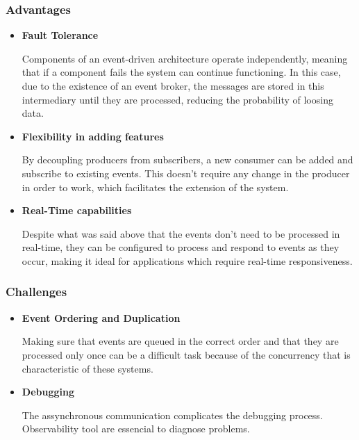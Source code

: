 \subsubsection{Advantages}
\begin{itemize}

	\item \textbf{Fault Tolerance}

	      Components of an event-driven architecture operate independently, meaning
	      that if a component fails the system can continue functioning. In this
	      case, due to the existence of an event broker, the messages are stored in
	      this intermediary until they are processed, reducing the probability of
	      loosing data\cite{AWSEventDriven}.

	\item \textbf{Flexibility in adding features}

	      By decoupling producers from subscribers, a new consumer can be added
	      and subscribe to existing events. This doesn't require any change in the
	      producer in order to work, which facilitates the extension of the
	      system\cite{MicrosoftEventDriven}.

	\item \textbf{Real-Time capabilities}

	      Despite what was said above that the events don't need to be processed
	      in real-time, they can be configured to process and respond to events
	      as they occur, making it ideal for applications which require real-time
	      responsiveness\cite{manchana2021event}.
\end{itemize}

\subsubsection{Challenges}
\begin{itemize}
	\item \textbf{Event Ordering and Duplication}

	      Making sure that events are queued in the correct order and that they are
	      processed only once can be a difficult task because of the concurrency
	      that is characteristic of these systems\cite{MicrosoftEventDriven}.

	\item \textbf{Debugging}

	      The assynchronous communication complicates the debugging process.
	      Observability tool are essencial to diagnose problems\cite{manchana2021event}.

\end{itemize}

